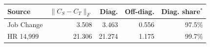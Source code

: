 \begin{tabular}{lrrrr}
\hline
Source & $\|C_S-C_T\|_F$ & Diag. & Off-diag. & Diag. share$^{\ast}$ \\
\hline
Job Change & 3.508 & 3.463 & 0.556 & 97.5\% \\
HR 14,999 & 21.306 & 21.274 & 1.175 & 99.7\% \\
\hline
\end{tabular}
